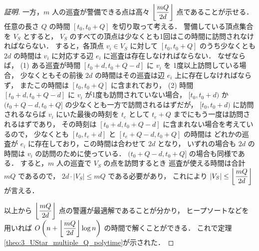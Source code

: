 \begin{proof}[証明]
一方，$m$ 人の巡査が警備できる点は高々 $\left\lfloor{\dfrac{mQ}{2d}}\right\rfloor$ 点であることが示せる．
任意の長さ $Q$ の時間 $[t_0, t_0 + Q]$ を切り取って考える．
警備している頂点集合を $V_S$ とすると，
$V_S$ のすべての頂点は少なくとも1回はこの時間に訪問されなければならない．
すると，各頂点 $v_i \in V_S$ に対して
$[t_0, t_0 + Q]$ のうち少なくとも $2d$ の時間は
$v_i$ に対応する辺 $e_i$ に巡査は存在しなければならない．
なぜならば，
(1) ある巡査が時間 $[t_0 + d, t_0 + Q - d]$ に $v_i$ を
1度以上訪問している場合，
少なくともその前後 $2d$ の時間はその巡査は辺 $e_i$ 上に存在しなければならず，
またこの時間は $[t_0, t_0 + Q]$ に含まれており，
(2) 時間 $[t_0 + d, t_0 + Q - d]$ に $v_i$ が1度も訪問されていない場合，
$[t_0, t_0 + d)$ か $(t_0 + Q - d, t_0 + Q]$ の少なくとも一方で訪問されるはずだが，
$[t_0, t_0 + d)$ に訪問されるならば $v_i$ にいた最後の時刻を $t_e$ として
$t_e + Q$ までにもう一度は訪問されるはずであり，
その時刻は $[t_0 + d, t_0 + Q - d]$ に含まれない場合を考えているので，
少なくとも $[t_0, t_e + d]$ と $[t_e + Q - d, t_0 + Q]$ の時間は
どれかの巡査が $e_i$ に存在しており，この時間は合わせて $2d$ となり，
いずれの場合も $2d$ の時間は $v_i$ の訪問のために使っている．
$(t_0 + Q - d, t_0 + Q]$ の場合も同様である．
すると，$m$ 人の巡査で $V_S$ の点を訪問するとき
巡査が使える時間は合計 $mQ$ であるので，
$2d \cdot |V_S| \leq mQ$ である必要があり，
これにより $|V_S| \leq \left\lfloor{\dfrac{mQ}{2d}}\right\rfloor$ が言える．

以上から $\left\lfloor{\dfrac{mQ}{2d}}\right\rfloor$ 点の警邏が最適解であることが分かり，
ヒープソートなどを用いれば
$O\left(n + \left\lfloor{\dfrac{mQ}{2d}}\right\rfloor \log n\right)$ の時間で解くことができる．
これで定理\ref{theo:3_UStar_multiple_Q_polytime}が示された．
\end{proof}





